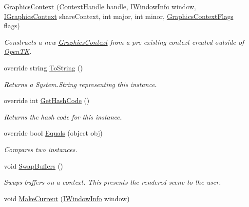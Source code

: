 \begin{DoxyCompactItemize}
\hyperlink{class_open_t_k_1_1_graphics_1_1_graphics_context_a3362b0338dccd8e180c8605fbf47b699}{Graphics\-Context} (\hyperlink{struct_open_t_k_1_1_context_handle}{Context\-Handle} handle, \hyperlink{interface_open_t_k_1_1_platform_1_1_i_window_info}{I\-Window\-Info} window, \hyperlink{interface_open_t_k_1_1_graphics_1_1_i_graphics_context}{I\-Graphics\-Context} share\-Context, int major, int minor, \hyperlink{namespace_open_t_k_1_1_graphics_a518f77952bc406a013160356981ea8ab}{Graphics\-Context\-Flags} flags)
\begin{DoxyCompactList}\small\item\em Constructs a new \hyperlink{class_open_t_k_1_1_graphics_1_1_graphics_context}{Graphics\-Context} from a pre-\/existing context created outside of \hyperlink{namespace_open_t_k}{Open\-T\-K}. \end{DoxyCompactList}\item 
override string \hyperlink{class_open_t_k_1_1_graphics_1_1_graphics_context_a66b97498dd4493a57f96268e432b9bec}{To\-String} ()
\begin{DoxyCompactList}\small\item\em Returns a System.\-String representing this instance. \end{DoxyCompactList}\item 
override int \hyperlink{class_open_t_k_1_1_graphics_1_1_graphics_context_a2d1fad8ad4a48dd77ec171083b3fe9a0}{Get\-Hash\-Code} ()
\begin{DoxyCompactList}\small\item\em Returns the hash code for this instance. \end{DoxyCompactList}\item 
override bool \hyperlink{class_open_t_k_1_1_graphics_1_1_graphics_context_ade7fe9534a1b711a0a0411ca371b07c5}{Equals} (object obj)
\begin{DoxyCompactList}\small\item\em Compares two instances. \end{DoxyCompactList}\item 
void \hyperlink{class_open_t_k_1_1_graphics_1_1_graphics_context_ab73c61bea26369cf76dff2165f5084cf}{Swap\-Buffers} ()
\begin{DoxyCompactList}\small\item\em Swaps buffers on a context. This presents the rendered scene to the user. \end{DoxyCompactList}\item 
void \hyperlink{class_open_t_k_1_1_graphics_1_1_graphics_context_a4b9b3b0f98fc1dc9f49f8abdb5ff076b}{Make\-Current} (\hyperlink{interface_open_t_k_1_1_platform_1_1_i_window_info}{I\-Window\-Info} window)

\end{DoxyCompactItemize}
